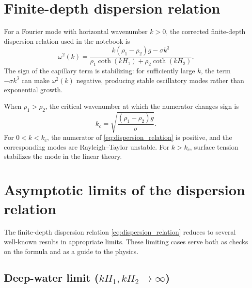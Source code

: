 \documentclass[11pt,a4paper]{article}
\begin{document}
\section{Finite-depth dispersion relation}

For a Fourier mode with horizontal wavenumber $k>0$, the corrected finite-depth dispersion relation used in the notebook is
\begin{equation}
    \boxed{
    \omega^2(k)
    =
    \frac{k(\rho_1-\rho_2)g-\sigma k^3}
    {\rho_1\coth(kH_1)+\rho_2\coth(kH_2)}
    }.
    \label{eq:dispersion_relation}
\end{equation}
The sign of the capillary term is stabilizing: for sufficiently large $k$, the term $-\sigma k^3$ can make $\omega^2(k)$ negative, producing stable oscillatory modes rather than exponential growth.

When $\rho_1>\rho_2$, the critical wavenumber at which the numerator changes sign is
\begin{equation}
    k_c = \sqrt{\frac{(\rho_1-\rho_2)g}{\sigma}}.
    \label{eq:critical_wavenumber}
\end{equation}
For $0<k<k_c$, the numerator of \eqref{eq:dispersion_relation} is positive, and the corresponding modes are Rayleigh--Taylor unstable.  For $k>k_c$, surface tension stabilizes the mode in the linear theory.

\section{Asymptotic limits of the dispersion relation}

The finite-depth dispersion relation \eqref{eq:dispersion_relation} reduces to several well-known results in appropriate limits.  These limiting cases serve both as checks on the formula and as a guide to the physics.

\subsection{Deep-water limit ($kH_1,kH_2\to\infty$)}
\end{document}
